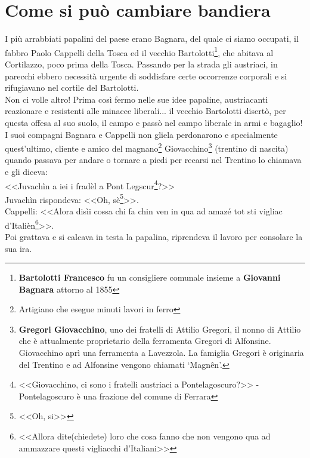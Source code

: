 
\chapter{Come si può cambiare bandiera}
I più arrabbiati papalini del paese erano Bagnara, del quale ci siamo occupati, il fabbro Paolo Cappelli della Tosca ed il vecchio Bartolotti\footnote{\textbf{Bartolotti Francesco} fu un consigliere comunale insieme a \textbf{Giovanni Bagnara} attorno al 1855}, che abitava al Cortilazzo, poco prima della Tosca. Passando per la strada gli austriaci, in parecchi ebbero necessità urgente di soddisfare certe occorrenze corporali e si rifugiavano nel cortile del Bartolotti.\\
\indent Non ci volle altro! Prima così fermo nelle sue idee papaline, austriacanti reazionare e resistenti alle minacce liberali... il vecchio Bartolotti disertò, per questa offesa al suo suolo, il campo e passò nel campo liberale in armi e bagaglio!\\
\indent I suoi compagni Bagnara e Cappelli non gliela perdonarono e specialmente quest'ultimo, cliente e amico del magnano\footnote{Artigiano che esegue minuti lavori in ferro} Giovacchino\footnote{\textbf{Gregori Giovacchino}, uno dei fratelli di Attilio Gregori, il nonno di Attilio che è attualmente proprietario della ferramenta Gregori di Alfonsine. Giovacchino aprì una ferramenta a Lavezzola. La famiglia Gregori è originaria del Trentino e ad Alfonsine vengono chiamati `Magnên'.} (trentino di nascita) quando passava per andare o tornare a piedi per recarsi nel Trentino lo chiamava e gli diceva:\\
\indent <<Juvachìn a iei i fradèl a Pont Legscur\footnote{<<Giovacchino, ci sono i fratelli austriaci a Pontelagoscuro?>> - Pontelagoscuro è una frazione del comune di Ferrara}?>>\\
\indent Juvachìn rispondeva: <<Oh, sè\footnote{<<Oh, si>>}>>.\\
\indent {}Cappelli: <<Alora disìi cossa chi fa chin ven in qua ad amazé tot sti vigliac d'Italièn\footnote{<<Allora dite(chiedete) loro che cosa fanno che non vengono qua ad ammazzare questi vigliacchi d'Italiani>>}>>.\\
\indent Poi grattava e si calcava in testa la papalina, riprendeva il lavoro per consolare la sua ira.

